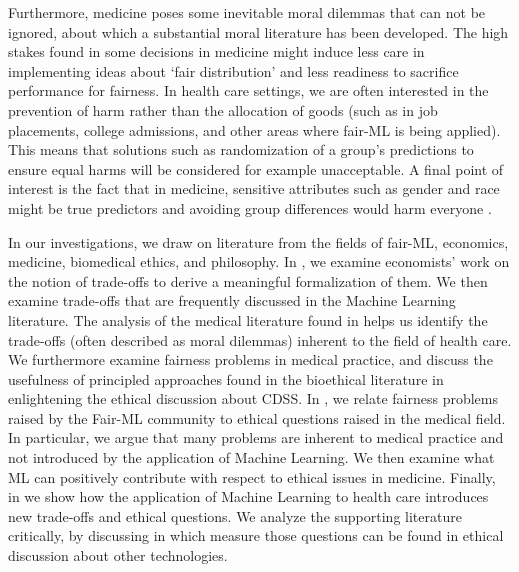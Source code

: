 Furthermore, medicine poses some inevitable moral dilemmas that can not be ignored, about which a substantial moral literature has been developed.
The high stakes found in some decisions in medicine might induce less care in implementing ideas about `fair distribution' and less readiness to sacrifice performance for fairness.
In health care settings, we are often interested in the prevention of harm rather than the allocation of goods (such as in job placements, college admissions, and other areas where fair-ML is being applied).
This means that solutions such as randomization of a group's predictions to ensure equal harms will be considered for example unacceptable.
A final point of interest is the fact that in medicine, sensitive attributes such as gender and race might be true predictors and avoiding group differences would harm everyone \cite{Mccradden2020}.

In our investigations, we draw on literature from the fields of fair-ML, economics, medicine, biomedical ethics, and philosophy.
In , we examine economists' work on the notion of trade-offs to derive a meaningful formalization of them.
We then examine trade-offs that are frequently discussed in the Machine Learning literature.
The analysis of the medical literature found in  helps us identify the trade-offs (often described as moral dilemmas) inherent to the field of health care.
We furthermore examine fairness problems in medical practice, and discuss the usefulness of principled approaches found in the bioethical literature in enlightening the ethical discussion about CDSS.
In , we relate fairness problems raised by the Fair-ML community to ethical questions raised in the medical field.
In particular, we argue that many problems are inherent to medical practice and not introduced by the application of Machine Learning.
We then examine what ML can positively contribute with respect to ethical issues in medicine.
Finally, in  we show how the application of Machine Learning to health care introduces new trade-offs and ethical questions.
We analyze the supporting literature critically, by discussing in which measure those questions can be found in ethical discussion about other technologies.
